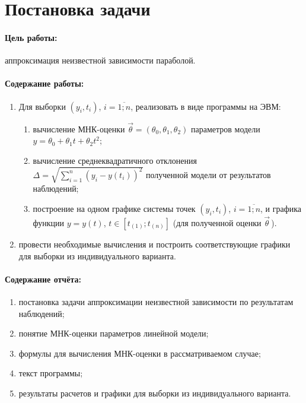 
\section{Постановка задачи}

\paragraph{Цель работы:} аппроксимация неизвестной зависимости параболой.

\paragraph{Содержание работы:}
\begin{enumerate}
    \item Для выборки $(y_i, t_i)$, $i = \overline{1; n}$, реализовать в виде программы на ЭВМ:
    \begin{enumerate}
        \item вычисление МНК-оценки $\vec\theta = (\theta_0, \theta_1, \theta_2)$ параметров модели $y = \theta_0 + \theta_1 t + \theta_2 t^2$;
        \item вычисление среднеквадратичного отклонения $\Delta = \sqrt{\sum_{i=1}^{n}\left(y_i - y(t_i)\right)^2}$ полученной модели от результатов наблюдений;
        \item построение на одном графике системы точек $(y_i, t_i)$, $i = \overline{1; n}$, и графика функции $y = y(t)$, $t \in \left[t_{(1)}; t_{(n)}\right]$ (для полученной оценки $\vec\theta$\,).
    \end{enumerate}
    \item провести необходимые вычисления и построить соответствующие графики для выборки из индивидуального варианта.
\end{enumerate}

\paragraph{Содержание отчёта:}
\begin{enumerate}
    \item постановка задачи аппроксимации неизвестной зависимости по результатам наблюдений;
    \item понятие МНК-оценки параметров линейной модели;
    \item формулы для вычисления МНК-оценки в рассматриваемом случае;
    \item текст программы;
    \item результаты расчетов и графики для выборки из индивидуального варианта.
\end{enumerate}